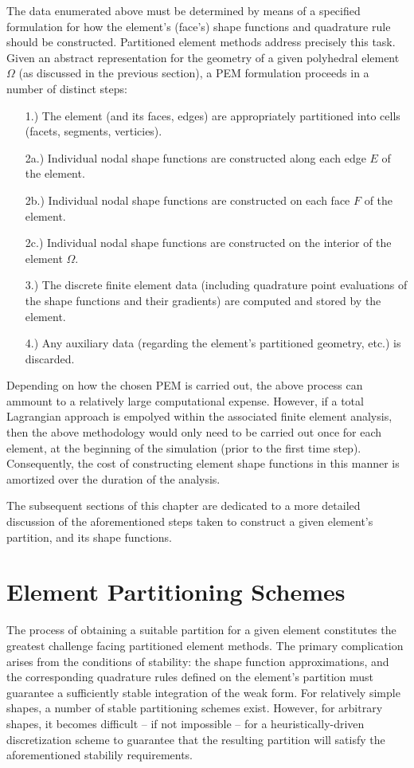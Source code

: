 	The data enumerated above must be determined by means of a specified formulation for how the element's (face's) shape functions and quadrature rule should be constructed. Partitioned element methods address precisely this task. Given an abstract representation for the geometry of a given polyhedral element $\Omega$ (as discussed in the previous section), a PEM formulation proceeds in a number of distinct steps:
	\begin{itemize}
		\item[1.)] The element (and its faces, edges) are appropriately partitioned into cells (facets, segments, verticies).
		\item[2a.)] Individual nodal shape functions are constructed along each edge $E$ of the element.
		\item[2b.)] Individual nodal shape functions are constructed on each face $F$ of the element.
		\item[2c.)] Individual nodal shape functions are constructed on the interior of the element $\Omega$.
		\item[3.)] The discrete finite element data (including quadrature point evaluations of the shape functions and their gradients) are computed and stored by the element.
		\item[4.)] Any auxiliary data (regarding the element's partitioned geometry, etc.) is discarded.
	\end{itemize}
	
	Depending on how the chosen PEM is carried out, the above process can ammount to a relatively large computational expense. However, if a total Lagrangian approach is empolyed within the associated finite element analysis, then the above methodology would only need to be carried out once for each element, at the beginning of the simulation (prior to the first time step). Consequently, the cost of constructing element shape functions in this manner is amortized over the duration of the analysis.
	
	The subsequent sections of this chapter are dedicated to a more detailed discussion of the aforementioned steps taken to construct a given element's partition, and its shape functions.
	
\section{Element Partitioning Schemes}

	The process of obtaining a suitable partition for a given element constitutes the greatest challenge facing partitioned element methods. The primary complication arises from the conditions of stability: the shape function approximations, and the corresponding quadrature rules defined on the element's partition must guarantee a sufficiently stable integration of the weak form. For relatively simple shapes, a number of stable partitioning schemes exist. However, for arbitrary shapes, it becomes difficult -- if not impossible -- for a heuristically-driven discretization scheme to guarantee that the resulting partition will satisfy the aforementioned stabilily requirements.

